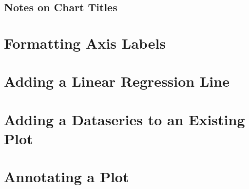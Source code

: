 \documentclass[
]{book}
\begin{document}
\hypertarget{notes-on-chart-titles}{%
\subsection{Notes on Chart Titles}\label{notes-on-chart-titles}}

\hypertarget{formatting-axis-labels}{%
\section{Formatting Axis Labels}\label{formatting-axis-labels}}

\hypertarget{adding-a-linear-regression-line}{%
\section{Adding a Linear Regression Line}\label{adding-a-linear-regression-line}}

\hypertarget{adding-a-dataseries-to-an-existing-plot}{%
\section{Adding a Dataseries to an Existing Plot}\label{adding-a-dataseries-to-an-existing-plot}}

\hypertarget{annotating-a-plot}{%
\section{Annotating a Plot}\label{annotating-a-plot}}

  
\end{document}
